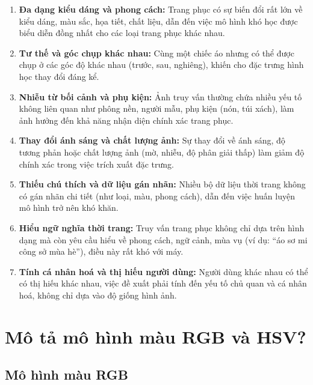 \documentclass[12pt]{article}
\begin{document}
	\begin{enumerate}[label=\textbf{\arabic*.}]
	\item \textbf{Đa dạng kiểu dáng và phong cách:}  
	Trang phục có sự biến đổi rất lớn về kiểu dáng, màu sắc, họa tiết, chất liệu, dẫn đến việc mô hình khó học được biểu diễn đồng nhất cho các loại trang phục khác nhau.
	
	\item \textbf{Tư thế và góc chụp khác nhau:}  
	Cùng một chiếc áo nhưng có thể được chụp ở các góc độ khác nhau (trước, sau, nghiêng), khiến cho đặc trưng hình học thay đổi đáng kể.
	
	\item \textbf{Nhiễu từ bối cảnh và phụ kiện:}  
	Ảnh truy vấn thường chứa nhiều yếu tố không liên quan như phông nền, người mẫu, phụ kiện (nón, túi xách), làm ảnh hưởng đến khả năng nhận diện chính xác trang phục.
	
	\item \textbf{Thay đổi ánh sáng và chất lượng ảnh:}  
	Sự thay đổi về ánh sáng, độ tương phản hoặc chất lượng ảnh (mờ, nhiễu, độ phân giải thấp) làm giảm độ chính xác trong việc trích xuất đặc trưng.
	
	\item \textbf{Thiếu chú thích và dữ liệu gán nhãn:}  
	Nhiều bộ dữ liệu thời trang không có gán nhãn chi tiết (như loại, màu, phong cách), dẫn đến việc huấn luyện mô hình trở nên khó khăn.
	
	\item \textbf{Hiểu ngữ nghĩa thời trang:}  
	Truy vấn trang phục không chỉ dựa trên hình dạng mà còn yêu cầu hiểu về phong cách, ngữ cảnh, mùa vụ (ví dụ: ``áo sơ mi công sở mùa hè''), điều này rất khó với máy.
	
	\item \textbf{Tính cá nhân hoá và thị hiếu người dùng:}  
	Người dùng khác nhau có thể có thị hiếu khác nhau, việc đề xuất phải tính đến yếu tố chủ quan và cá nhân hoá, không chỉ dựa vào độ giống hình ảnh.
	\end{enumerate}
	
	\section{Mô tả mô hình màu RGB và HSV?}
	
	\subsection{Mô hình màu RGB}
	
\end{document}

